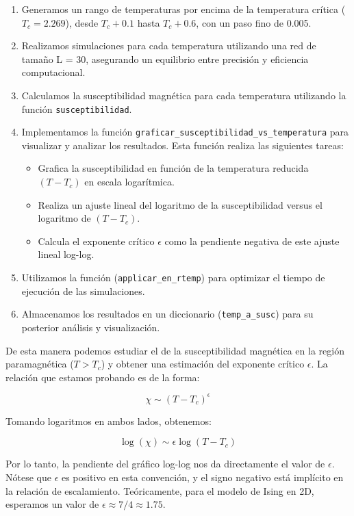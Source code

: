 \documentclass[twocolumn]{article}
\begin{document}
\begin{enumerate}
    \item Generamos un rango de temperaturas por encima de la temperatura crítica ($T_c = 2.269$), desde $T_c + 0.1$ hasta $T_c + 0.6$, con un paso fino de 0.005.
    
    \item Realizamos simulaciones para cada temperatura utilizando una red de tamaño L = 30, asegurando un equilibrio entre precisión y eficiencia computacional.
    
    \item Calculamos la susceptibilidad magnética para cada temperatura utilizando la función \texttt{susceptibilidad}.
    
    \item Implementamos la función \texttt{graficar\_susceptibilidad\_vs\_temperatura} para visualizar y analizar los resultados. Esta función realiza las siguientes tareas:
    \begin{itemize}
        \item Grafica la susceptibilidad en función de la temperatura reducida $(T - T_c)$ en escala logarítmica.
        \item Realiza un ajuste lineal del logaritmo de la susceptibilidad versus el logaritmo de $(T - T_c)$.
        \item Calcula el exponente crítico $\epsilon$ como la pendiente negativa de este ajuste lineal log-log.
    \end{itemize}

    \item Utilizamos la función (\texttt{applicar\_en\_rtemp}) para optimizar el tiempo de ejecución de las simulaciones.
    
    \item Almacenamos los resultados en un diccionario (\texttt{temp\_a\_susc}) para su posterior análisis y visualización.
\end{enumerate}

De esta manera podemos estudiar el de la susceptibilidad magnética en la región paramagnética ($T > T_c$) y obtener una estimación del exponente crítico $\epsilon$. La relación que estamos probando es de la forma:

\[ \chi \sim (T - T_c)^{\epsilon} \]

Tomando logaritmos en ambos lados, obtenemos:

\[ \log(\chi) \sim \epsilon \log(T - T_c) \]

Por lo tanto, la pendiente del gráfico log-log nos da directamente el valor de $\epsilon$. Nótese que $\epsilon$ es positivo en esta convención, y el signo negativo está implícito en la relación de escalamiento. Teóricamente, para el modelo de Ising en 2D, esperamos un valor de $\epsilon \approx 7/4 \approx 1.75$.
\end{document}
